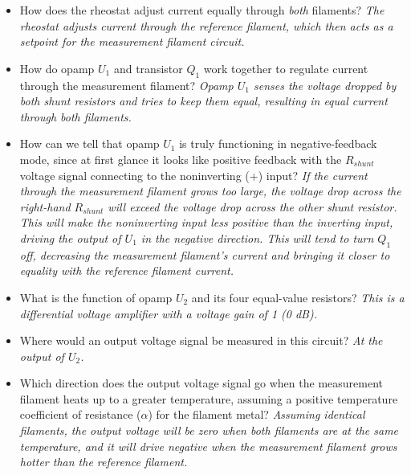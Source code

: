 





\begin{itemize}
\item{} How does the rheostat adjust current equally through {\it both} filaments?  {\it The rheostat adjusts current through the reference filament, which then acts as a setpoint for the measurement filament circuit.}
\vskip 10pt
\item{} How do opamp $U_1$ and transistor $Q_1$ work together to regulate current through the measurement filament? {\it Opamp $U_1$ senses the voltage dropped by both shunt resistors and tries to keep them equal, resulting in equal current through both filaments.}
\vskip 10pt
\item{} How can we tell that opamp $U_1$ is truly functioning in negative-feedback mode, since at first glance it looks like positive feedback with the $R_{shunt}$ voltage signal connecting to the noninverting (+) input? {\it If the current through the measurement filament grows too large, the voltage drop across the right-hand $R_{shunt}$ will exceed the voltage drop across the other shunt resistor.  This will make the noninverting input less positive than the inverting input, driving the output of $U_1$ in the negative direction.  This will tend to turn $Q_1$ off, decreasing the measurement filament's current and bringing it closer to equality with the reference filament current.}
\vskip 10pt
\item{} What is the function of opamp $U_2$ and its four equal-value resistors? {\it This is a differential voltage amplifier with a voltage gain of 1 (0 dB).}
\vskip 10pt
\item{} Where would an output voltage signal be measured in this circuit? {\it At the output of $U_2$.}
\vskip 10pt
\item{} Which direction does the output voltage signal go when the measurement filament heats up to a greater temperature, assuming a positive temperature coefficient of resistance ($\alpha$) for the filament metal? {\it Assuming identical filaments, the output voltage will be zero when both filaments are at the same temperature, and it will drive negative when the measurement filament grows hotter than the reference filament.}
\end{itemize}







